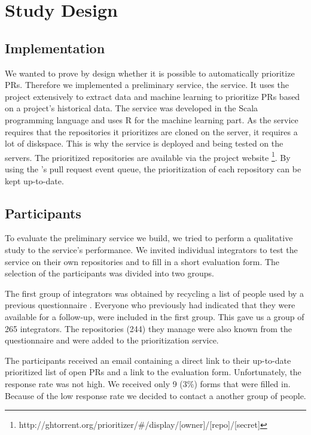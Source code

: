 \section{Study Design}
\label{sec:design}

\subsection{Implementation}
We wanted to prove by design whether it is possible to automatically prioritize PRs.
Therefore we implemented a preliminary service, the \prioritizer service.
It uses the \ghtorrent project extensively to extract data and machine learning to prioritize PRs based on a project's historical data.
The service was developed in the Scala programming language and uses R for the machine learning part.
As the service requires that the repositories it prioritizes are cloned on the server, it requires a lot of diskspace.
This is why the service is deployed and being tested on the \ghtorrent servers.
The prioritized repositories are available via the \ghtorrent project website \footnote{http://ghtorrent.org/prioritizer/\#/display/[owner]/[repo]/[secret]}.
By using the \ghtorrent's pull request event queue, the prioritization of each repository can be kept up-to-date.

\subsection{Participants}
To evaluate the preliminary service we build, we tried to perform a qualitative study to the service's performance.
We invited individual integrators to test the service on their own repositories and to fill in a short evaluation form.
The selection of the participants was divided into two groups.

The first group of integrators was obtained by recycling a list of people used by a previous questionnaire \cite{GZSD15}.
Everyone who previously had indicated that they were available for a follow-up, were included in the first group.
This gave us a group of 265 integrators.
The repositories (244) they manage were also known from the questionnaire and were added to the prioritization service.

The participants received an email containing a direct link to their up-to-date prioritized list of open PRs and a link to the evaluation form.
Unfortunately, the response rate was not high.
We received only 9 (3\%) forms that were filled in.
Because of the low response rate we decided to contact a another group of people.

